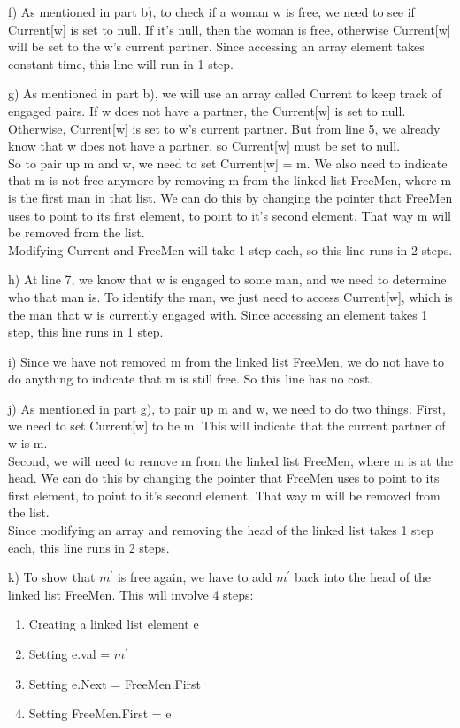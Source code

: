 \documentclass{article}
\begin{document}
f) As mentioned in part b), to check if a woman w is free, we need to see if Current[w] is set to null. If it's null, then the woman is free, otherwise Current[w] will be set to the w's current partner. Since accessing an array element takes constant time, this line will run in 1 step.

g) As mentioned in part b), we will use an array called Current to keep track of engaged pairs. If w does not have a partner, the Current[w] is set to null. Otherwise, Current[w] is set to w's current partner. But from line 5, we already know that w does not have a partner, so Current[w] must be set to null. \\
So to pair up m and w, we need to set Current[w] = m.
We also need to indicate that m is not free anymore by removing m from the linked list FreeMen, where m is the first man in that list. We can do this by changing the pointer that FreeMen uses to point to its first element, to point to it's second element. That way m will be removed from the list.\\
Modifying Current and FreeMen will take 1 step each, so this line runs in 2 steps.
 
h) At line 7, we know that w is engaged to some man, and we need to determine who that man is. To identify the man, we just need to access Current[w], which is the man that w is currently engaged with. Since accessing an element takes 1 step, this line runs in 1 step.

i) Since we have not removed m from the linked list FreeMen, we do not have to do anything to indicate that m is still free. So this line has no cost.

j) As mentioned in part g), to pair up m and w, we need to do two things. First, we need to set Current[w] to be m. This will indicate that the current partner of w is m.\\
Second, we will need to remove m from the linked list FreeMen, where m is at the head. We can do this by changing the pointer that FreeMen uses to point to its first element, to point to it's second element. That way m will be removed from the list.\\
Since modifying an array and removing the head of the linked list takes 1 step each, this line runs in 2 steps.


k) To show that $m^\prime$ is free again, we have to add $m^\prime$ back into the head of the linked list FreeMen. This will involve 4 steps: 
\begin{enumerate}
    \item Creating a linked list element e
    \item Setting e.val = $m^\prime$
    \item Setting e.Next = FreeMen.First
    \item Setting FreeMen.First = e
\end{enumerate}
\end{document}
